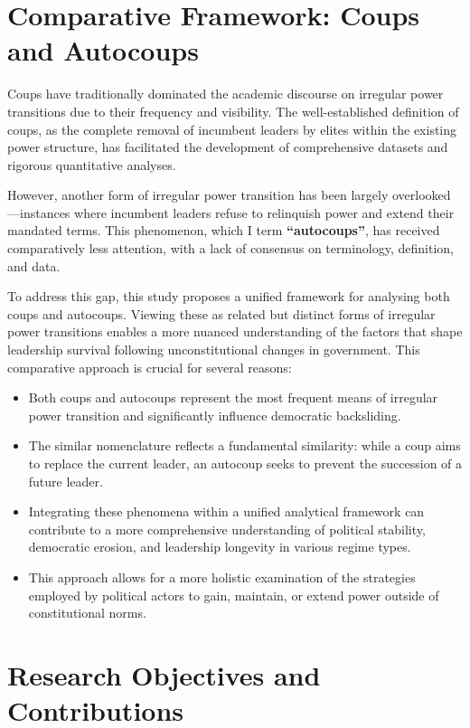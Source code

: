 \documentclass[
  12pt,
]{report}
\begin{document}
\section{Comparative Framework: Coups and
Autocoups}\label{comparative-framework-coups-and-autocoups}

Coups have traditionally dominated the academic discourse on irregular
power transitions due to their frequency and visibility. The
well-established definition of coups, as the complete removal of
incumbent leaders by elites within the existing power structure, has
facilitated the development of comprehensive datasets and rigorous
quantitative analyses.

However, another form of irregular power transition has been largely
overlooked---instances where incumbent leaders refuse to relinquish
power and extend their mandated terms. This phenomenon, which I term
\textbf{``autocoups''}, has received comparatively less attention, with
a lack of consensus on terminology, definition, and data.

To address this gap, this study proposes a unified framework for
analysing both coups and autocoups. Viewing these as related but
distinct forms of irregular power transitions enables a more nuanced
understanding of the factors that shape leadership survival following
unconstitutional changes in government. This comparative approach is
crucial for several reasons:

\begin{itemize}
\item
  Both coups and autocoups represent the most frequent means of
  irregular power transition and significantly influence democratic
  backsliding.
\item
  The similar nomenclature reflects a fundamental similarity: while a
  coup aims to replace the current leader, an autocoup seeks to prevent
  the succession of a future leader.
\item
  Integrating these phenomena within a unified analytical framework can
  contribute to a more comprehensive understanding of political
  stability, democratic erosion, and leadership longevity in various
  regime types.
\item
  This approach allows for a more holistic examination of the strategies
  employed by political actors to gain, maintain, or extend power
  outside of constitutional norms.
\end{itemize}

\section{Research Objectives and
Contributions}\label{research-objectives-and-contributions}
\end{document}
